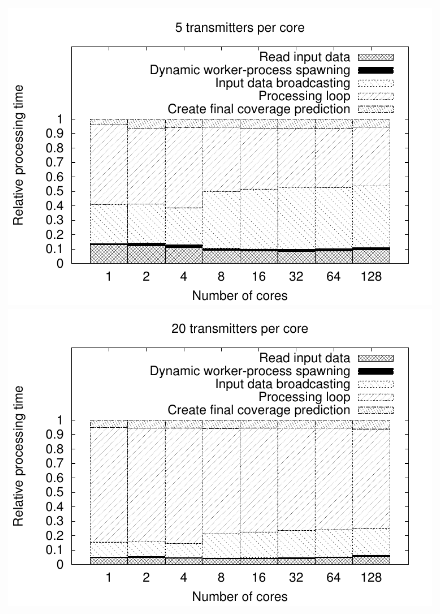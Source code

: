 \begin{figure}
\begin{minipage}[t]{0.31\textwidth}%
\centering

\includegraphics[width=1\columnwidth]{04-framework_design_and_implementation/img/weak_scaling_relative_time_plot_5}%
\end{minipage}\qquad{}%
\begin{minipage}[t]{0.31\textwidth}%
\centering

\includegraphics[width=1\columnwidth]{04-framework_design_and_implementation/img/weak_scaling_relative_time_plot_20}%
\end{minipage}\qquad{}%
\begin{minipage}[t]{0.31\textwidth}%
\centering


\end{minipage}
\end{figure}
